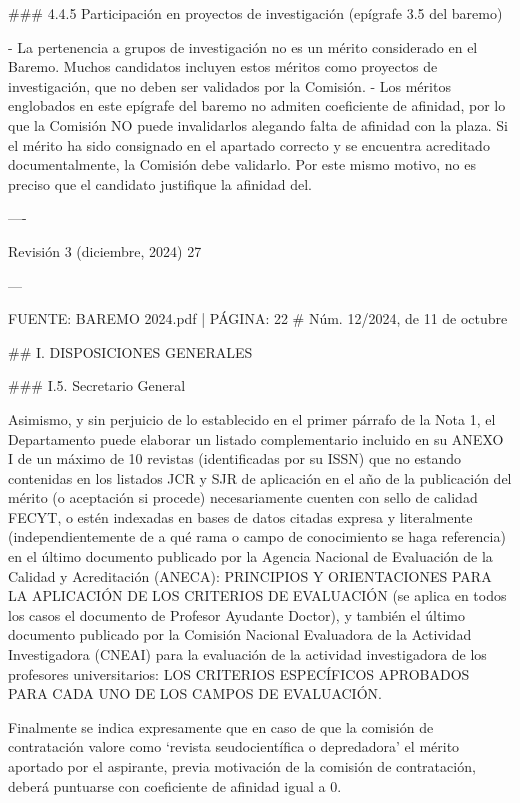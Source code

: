 \documentclass{article}
\begin{document}
\begin{itemize}
\begin{itemize}
\begin{scriptsize}
                  \#\#\# 4.4.5 Participación en proyectos de investigación (epígrafe 3.5 del baremo)

                  - La pertenencia a grupos de investigación no es un mérito considerado en el Baremo. Muchos candidatos incluyen estos méritos como proyectos de investigación, que no deben ser validados por la Comisión.
                  - Los méritos englobados en este epígrafe del baremo no admiten coeficiente de afinidad, por lo que la Comisión NO puede invalidarlos alegando falta de afinidad con la plaza. Si el mérito ha sido consignado en el apartado correcto y se encuentra acreditado documentalmente, la Comisión debe validarlo. Por este mismo motivo, no es preciso que el candidato justifique la afinidad del.

                  ----

                  Revisión 3 (diciembre, 2024) 27

                  ---

                  FUENTE: BAREMO 2024.pdf | PÁGINA: 22
                  \# Núm. 12/2024, de 11 de octubre

                  \#\# I. DISPOSICIONES GENERALES

                  \#\#\# I.5. Secretario General

                  Asimismo, y sin perjuicio de lo establecido en el primer párrafo de la Nota 1, el Departamento puede elaborar un listado complementario incluido en su ANEXO I de un máximo de 10 revistas (identificadas por su ISSN) que no estando contenidas en los listados JCR y SJR de aplicación en el año de la publicación del mérito (o aceptación si procede) necesariamente cuenten con sello de calidad FECYT, o estén indexadas en bases de datos citadas expresa y literalmente (independientemente de a qué rama o campo de conocimiento se haga referencia) en el último documento publicado por la Agencia Nacional de Evaluación de la Calidad y Acreditación (ANECA): PRINCIPIOS Y ORIENTACIONES PARA LA APLICACIÓN DE LOS CRITERIOS DE EVALUACIÓN (se aplica en todos los casos el documento de Profesor Ayudante Doctor), y también el último documento publicado por la Comisión Nacional Evaluadora de la Actividad Investigadora (CNEAI) para la evaluación de la actividad investigadora de los profesores universitarios: LOS CRITERIOS ESPECÍFICOS APROBADOS PARA CADA UNO DE LOS CAMPOS DE EVALUACIÓN.

                  Finalmente se indica expresamente que en caso de que la comisión de contratación valore como ‘revista seudocientífica o depredadora’ el mérito aportado por el aspirante, previa motivación de la comisión de contratación, deberá puntuarse con coeficiente de afinidad igual a 0.


\end{scriptsize}
\end{itemize}
\end{itemize}
\end{document}

